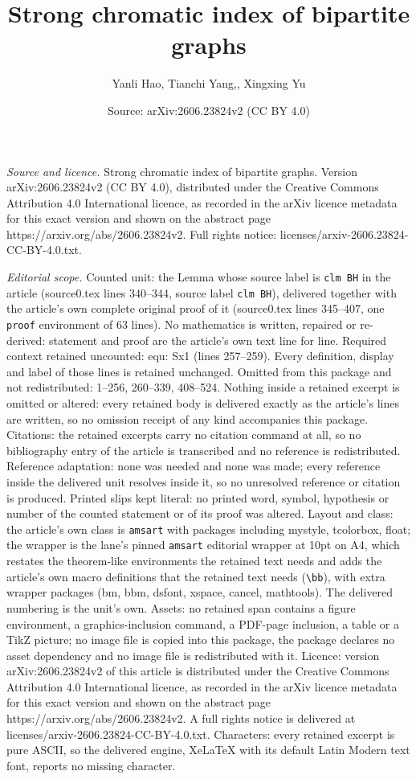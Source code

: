 \documentclass[10pt,a4paper]{amsart}
\title[Strong chromatic index of bipartite graphs]{Strong chromatic index of bipartite graphs}
\author{Yanli Hao, Tianchi Yang,, Xingxing Yu}
\date{Source: arXiv:2606.23824v2 (CC BY 4.0)}
\begin{document}
\maketitle

\noindent\emph{Source and licence.} Strong chromatic index of bipartite graphs. Version arXiv:2606.23824v2 (CC BY 4.0), distributed under the Creative Commons Attribution 4.0 International licence, as recorded in the arXiv licence metadata for this exact version and shown on the abstract page https://arxiv.org/abs/2606.23824v2. Full rights notice: licenses/arxiv-2606.23824-CC-BY-4.0.txt.\par\smallskip

\noindent\textit{Editorial scope.} Counted unit: the Lemma whose source label is \texttt{clm BH} in the article (source0.tex lines 340--344, source label \texttt{clm BH}), delivered together with the article's own complete original proof of it (source0.tex lines 345--407, one \texttt{proof} environment of 63 lines). No mathematics is written, repaired or re-derived: statement and proof are the article's own text line for line. Required context retained uncounted: equ: Sx1 (lines 257--259). Every definition, display and label of those lines is retained unchanged. Omitted from this package and not redistributed: 1--256, 260--339, 408--524. Nothing inside a retained excerpt is omitted or altered: every retained body is delivered exactly as the article's lines are written, so no omission receipt of any kind accompanies this package. Citations: the retained excerpts carry no citation command at all, so no bibliography entry of the article is transcribed and no reference is redistributed. Reference adaptation: none was needed and none was made; every reference inside the delivered unit resolves inside it, so no unresolved reference or citation is produced. Printed slips kept literal: no printed word, symbol, hypothesis or number of the counted statement or of its proof was altered. Layout and class: the article's own class is \texttt{amsart} with packages including mystyle, tcolorbox, float; the wrapper is the lane's pinned \texttt{amsart} editorial wrapper at 10pt on A4, which restates the theorem-like environments the retained text needs and adds the article's own macro definitions that the retained text needs (\texttt{\textbackslash bb}), with extra wrapper packages (bm, bbm, dsfont, xspace, cancel, mathtools). The delivered numbering is the unit's own. Assets: no retained span contains a figure environment, a graphics-inclusion command, a PDF-page inclusion, a table or a TikZ picture; no image file is copied into this package, the package declares no asset dependency and no image file is redistributed with it. Licence: version arXiv:2606.23824v2 of this article is distributed under the Creative Commons Attribution 4.0 International licence, as recorded in the arXiv licence metadata for this exact version and shown on the abstract page https://arxiv.org/abs/2606.23824v2. A full rights notice is delivered at licenses/arxiv-2606.23824-CC-BY-4.0.txt. Characters: every retained excerpt is pure ASCII, so the delivered engine, XeLaTeX with its default Latin Modern text font, reports no missing character.
\end{document}
